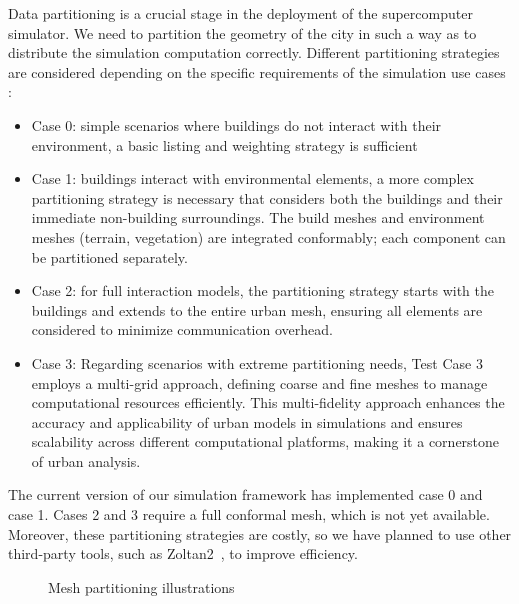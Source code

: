 \documentclass[runningheads]{llncs}
\begin{document}
Data partitioning is a crucial stage in the deployment of the supercomputer simulator. We need to partition the geometry of the city in such a way as to distribute the simulation computation correctly.
Different partitioning strategies are considered depending on the specific requirements of the simulation use cases :
\begin{itemize}
\item Case 0: simple scenarios where buildings do not interact with their environment, a basic listing and weighting strategy is sufficient
\item Case 1: buildings interact with environmental elements, a more complex partitioning strategy is necessary that considers both the buildings and their immediate non-building surroundings. The build meshes and environment meshes (terrain, vegetation) are integrated conformably; each component can be partitioned separately.
\item Case 2: for full interaction models, the partitioning strategy starts with the buildings and extends to the entire urban mesh, ensuring all elements are considered to minimize communication overhead.
\item Case 3: Regarding scenarios with extreme partitioning needs, Test Case 3 employs a multi-grid approach, defining coarse and fine meshes to manage computational resources efficiently. This multi-fidelity approach enhances the accuracy and applicability of urban models in simulations and ensures scalability across different computational platforms, making it a cornerstone of urban analysis.
\end{itemize}

The current version of our simulation framework has implemented case 0 and case 1. Cases 2 and 3 require a full conformal mesh, which is not yet available. Moreover, these partitioning strategies are costly, so we have planned to use other third-party tools, such as Zoltan2~\cite{the_zoltan2_team_zoltan2_nodate}, to improve efficiency.
\begin{figure}
\centering
{}
\caption{Mesh partitioning illustrations}
\label{fig:partitioning}
\end{figure}
\end{document}
